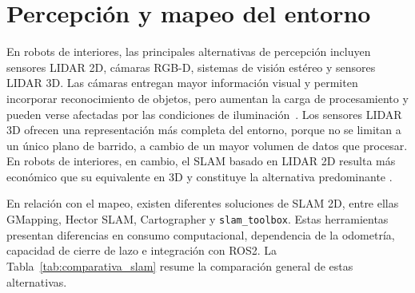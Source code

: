 \section{Percepción y mapeo del entorno}
\label{sec:sensores}

En robots de interiores, las principales alternativas de percepción incluyen
sensores \gls{LIDAR} 2D, cámaras RGB-D, sistemas de visión estéreo y sensores
\gls{LIDAR} 3D. Las cámaras entregan mayor información visual y permiten
incorporar reconocimiento de objetos, pero aumentan la carga de procesamiento y
pueden verse afectadas por las condiciones de iluminación~\citep{tourani2022visual}. Los sensores \gls{LIDAR} 3D ofrecen una representación más completa del entorno, porque no se limitan a un único plano de barrido, a cambio de un mayor volumen de datos que procesar. En robots de interiores, en cambio, el SLAM basado en \gls{LIDAR} 2D resulta más económico que su equivalente en 3D y constituye la alternativa predominante \citep{ran2025review2dlidar}.

En relación con el mapeo, existen diferentes soluciones de SLAM 2D,
entre ellas GMapping, Hector SLAM, Cartographer y
\texttt{slam\_toolbox}. Estas herramientas presentan diferencias en consumo
computacional, dependencia de la odometría, capacidad de cierre de lazo e
integración con \gls{ROS2}. La Tabla~\ref{tab:comparativa_slam} resume la
comparación general de estas alternativas.

